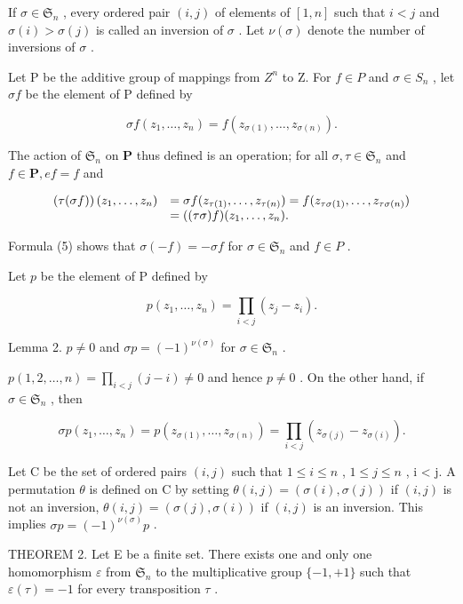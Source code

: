 If \(\sigma \in \mathfrak{S}_n\) , every ordered pair \((i,j)\) of elements of \([1,n]\) such that \(i < j\) and \(\sigma(i) > \sigma(j)\) is called an inversion of \(\sigma\) . Let \(\nu(\sigma)\) denote the number of inversions of \(\sigma\) .

Let P be the additive group of mappings from \(Z^{n}\) to Z. For \(f \in P\) and \(\sigma \in S_{n}\) , let \(\sigma f\) be the element of P defined by

\[
\sigma f (z _ {1}, \dots , z _ {n}) = f (z _ {\sigma (1)}, \dots , z _ {\sigma (n)}).\tag{5}
\]

The action of \(\mathfrak{S}_n\) on \(\mathbf{P}\) thus defined is an operation; for all \(\sigma, \tau \in \mathfrak{S}_n\) and \(f \in \mathbf{P}, ef = f\) and

\[
\begin{array}{r l} \left(\tau (\sigma f)\right) (z _ {1}, \dots , z _ {n}) & = \sigma f (z _ {\tau (1)}, \dots , z _ {\tau (n)}) = f (z _ {\tau \sigma (1)}, \dots , z _ {\tau \sigma (n)}) \\ & = ((\tau \sigma) f) (z _ {1}, \dots , z _ {n}). \end{array}
\]

Formula (5) shows that \(\sigma(-f) = -\sigma f\) for \(\sigma \in \mathfrak{S}_n\) and \(f \in P\) .

Let \(p\) be the element of P defined by

\[
p (z _ {1}, \dots , z _ {n}) = \prod_ {i <   j} (z _ {j} - z _ {i}).\tag{6}
\]

Lemma 2. \(p \neq 0\) and \(\sigma p = (-1)^{\nu(\sigma)}\) for \(\sigma \in \mathfrak{S}_n\) .

\(p(1,2,\ldots,n) = \prod_{i < j}(j - i)\neq 0\) and hence \(p\neq 0\) . On the other hand, if \(\sigma \in \mathfrak{S}_n\) , then

\[
\sigma p (z _ {1}, \dots , z _ {n}) = p (z _ {\sigma (1)}, \dots , z _ {\sigma (n)}) = \prod_ {i <   j} (z _ {\sigma (j)} - z _ {\sigma (i)}).
\]

Let C be the set of ordered pairs \((i,j)\) such that \(1 \leqslant i \leqslant n\) , \(1 \leqslant j \leqslant n\) , i \textless{} j. A permutation \(\theta\) is defined on C by setting \(\theta(i,j) = (\sigma(i), \sigma(j))\) if \((i,j)\) is not an inversion, \(\theta(i,j) = (\sigma(j), \sigma(i))\) if \((i,j)\) is an inversion. This implies \(\sigma p = (-1)^{\nu(\sigma)} p\) .

THEOREM 2. Let E be a finite set. There exists one and only one homomorphism \(\varepsilon\) from \(\mathfrak{S}_n\) to the multiplicative group \(\{-1, +1\}\) such that \(\varepsilon(\tau) = -1\) for every transposition \(\tau\) .

